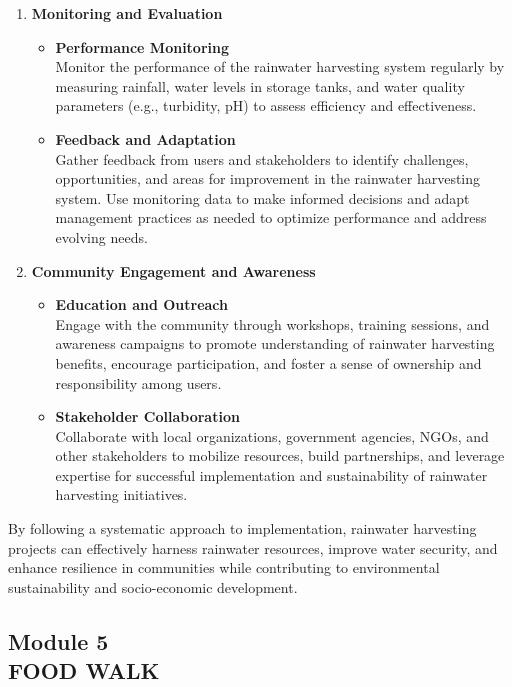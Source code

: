 \documentclass[12pt]{article}
\newcommand{\chapter}[2]{
	\setcounter{section}{#1}
	\setcounter{subsection}{0}
	\begin{center}
		\section*{Module #1 \\ #2}
	\end{center}
	\addcontentsline{toc}{section}{Module #1 \\ #2}
}
\begin{document}
\begin{enumerate}[label=\textbf{\arabic*.}]
		\item \textbf{Monitoring and Evaluation}
		\begin{itemize}
			\item \textbf{Performance Monitoring} \\
			Monitor the performance of the rainwater harvesting system regularly by measuring rainfall, water levels in storage tanks, and water quality parameters (e.g., turbidity, pH) to assess efficiency and effectiveness.
			\item \textbf{Feedback and Adaptation} \\
			Gather feedback from users and stakeholders to identify challenges, opportunities, and areas for improvement in the rainwater harvesting system. Use monitoring data to make informed decisions and adapt management practices as needed to optimize performance and address evolving needs.
		\end{itemize}

		\item \textbf{Community Engagement and Awareness}
		\begin{itemize}
			\item \textbf{Education and Outreach} \\
			Engage with the community through workshops, training sessions, and awareness campaigns to promote understanding of rainwater harvesting benefits, encourage participation, and foster a sense of ownership and responsibility among users.
			\item \textbf{Stakeholder Collaboration} \\
			Collaborate with local organizations, government agencies, NGOs, and other stakeholders to mobilize resources, build partnerships, and leverage expertise for successful implementation and sustainability of rainwater harvesting initiatives.
		\end{itemize}
	\end{enumerate}

	\par By following a systematic approach to implementation, rainwater harvesting projects can effectively harness rainwater resources, improve water security, and enhance resilience in communities while contributing to environmental sustainability and socio-economic development.

	 \newpage

	\chapter{5}{FOOD WALK}
\end{document}

